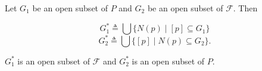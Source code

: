 Let $G_1$ be an open subset of $P$ and $G_2$ be an open subset of $\mathcal{F}$. Then

$$G_1^* \triangleq \bigcup \{N(p) \mid [p] \subseteq G_1\}$$
$$G_2^* \triangleq \bigcup \{[p] \mid N(p) \subseteq G_2\}.$$

$G_1^*$ is an open subset of $\mathcal{F}$ and $G_2^*$ is an open subset of $P$.
